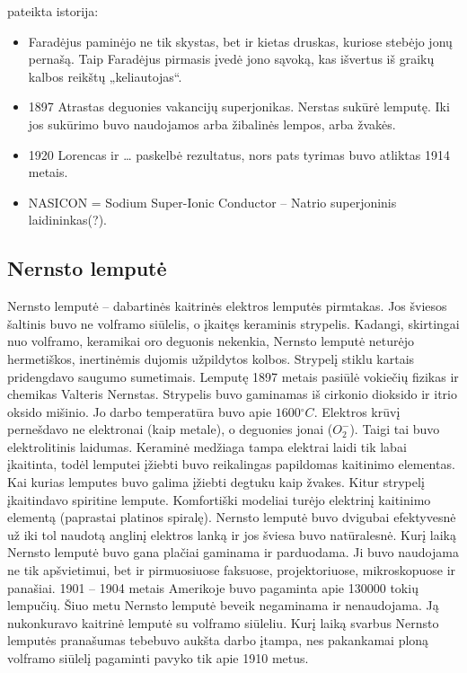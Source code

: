  pateikta istorija:
\begin{itemize}
  \item Faradėjus paminėjo ne tik skystas, bet ir kietas druskas,
    kuriose stebėjo jonų pernašą. Taip Faradėjus pirmasis įvedė
    jono sąvoką, kas išvertus iš graikų kalbos reikštų
    „keliautojas“.
  \item 1897 Atrastas deguonies vakancijų superjonikas. Nerstas
    sukūrė lemputę. Iki jos sukūrimo buvo naudojamos arba žibalinės
    lempos, arba žvakės.
  \item 1920 Lorencas ir … paskelbė rezultatus, nors pats tyrimas buvo
    atliktas 1914 metais.
  \item NASICON = Sodium Super-Ionic Conductor – Natrio superjoninis
    laidininkas(?).
\end{itemize}

\subsection{Nernsto lemputė}

Nernsto lemputė – dabartinės kaitrinės elektros lemputės pirmtakas.
Jos šviesos šaltinis buvo ne volframo siūlelis, o įkaitęs keraminis
strypelis. Kadangi, skirtingai nuo volframo, keramikai oro deguonis
nekenkia, Nernsto lemputė neturėjo hermetiškos, inertinėmis dujomis
užpildytos kolbos. Strypelį stiklu kartais pridengdavo saugumo
sumetimais. Lemputę 1897 metais pasiūlė vokiečių fizikas ir chemikas
Valteris Nernstas. Strypelis buvo gaminamas iš cirkonio dioksido ir
itrio oksido mišinio. Jo darbo temperatūra buvo apie
$1600 {}^{\circ}C$. Elektros krūvį pernešdavo ne elektronai (kaip
metale), o deguonies jonai ($O_{2}^{-}$). Taigi tai buvo elektrolitinis
laidumas. Keraminė medžiaga tampa elektrai laidi tik labai įkaitinta,
todėl lemputei įžiebti buvo reikalingas papildomas kaitinimo
elementas. Kai kurias lemputes buvo galima įžiebti degtuku kaip
žvakes. Kitur strypelį įkaitindavo spiritine lempute. Komfortiški
modeliai turėjo elektrinį kaitinimo elementą (paprastai platinos
spiralę). Nernsto lemputė buvo dvigubai efektyvesnė už iki tol
naudotą anglinį elektros lanką ir jos šviesa buvo natūralesnė.
Kurį laiką Nernsto lemputė buvo gana plačiai gaminama ir parduodama.
Ji buvo naudojama ne tik apšvietimui, bet ir pirmuosiuose faksuose,
projektoriuose, mikroskopuose ir panašiai. 1901 – 1904 metais
Amerikoje buvo pagaminta apie 130000 tokių lempučių. Šiuo metu
Nernsto lemputė beveik negaminama ir nenaudojama. Ją nukonkuravo
kaitrinė lemputė su volframo siūleliu. Kurį laiką svarbus Nernsto
lemputės pranašumas tebebuvo aukšta darbo įtampa, nes pakankamai
ploną volframo siūlelį pagaminti pavyko tik apie 1910 metus.

